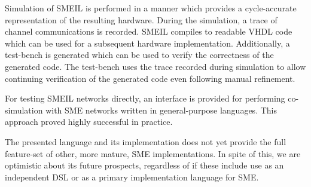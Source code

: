 Simulation of SMEIL is performed in a manner which provides a cycle-accurate
representation of the resulting hardware. During the simulation, a trace of
channel communications is recorded. SMEIL compiles to readable VHDL code which
can be used for a subsequent hardware implementation. Additionally, a test-bench
is generated which can be used to verify the correctness of the generated
code. The test-bench uses the trace recorded during simulation to allow
continuing verification of the generated code even following manual refinement.

For testing SMEIL networks directly, an interface is provided for performing
co-simulation with SME networks written in general-purpose languages. This
approach proved highly successful in practice.

The presented language and its implementation does not yet provide the full
feature-set of other, more mature, SME implementations. In spite of this, we are
optimistic about its future prospects, regardless of if these include use as an
independent DSL or as a primary implementation language for SME.

